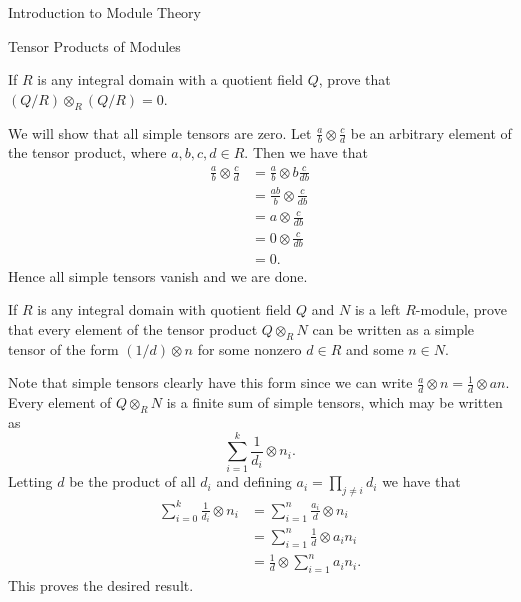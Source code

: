 \begin{chapter}{Introduction to Module Theory}
\begin{section}{Tensor Products of Modules}
\begin{solution}
\end{solution}\oneperpage



\begin{problem}\label{ex:10.4.6}
If $R$ is any integral domain with a quotient field $Q$, prove that $(Q/R)\otimes_R(Q/R) = 0$.
\end{problem}
\begin{solution}
We will show that all simple tensors are zero. Let $\frac{a}{b}\otimes \frac{c}{d}$ be an arbitrary element of the tensor product, where $a,b,c,d\in R$. Then we have that \begin{align*}
\frac{a}{b}\otimes \frac{c}{d} & =\frac{a}{b}\otimes b\frac{c}{db}\\
& =\frac{ab}{b}\otimes \frac{c}{db}\\
& =a\otimes \frac{c}{db}\\
& = 0\otimes \frac{c}{db}\\
& = 0.
\end{align*}
Hence all simple tensors vanish and we are done. 
\end{solution}\oneperpage



\begin{problem}\label{ex:10.4.7}
If $R$ is any integral domain with quotient field $Q$ and $N$ is a left $R$-module, prove that every element of the tensor product $Q\otimes_R N$ can be written as a simple tensor of the form $(1/d)\otimes n$ for some nonzero $d\in R$ and some $n\in N$. 
\end{problem}
\begin{solution}
Note that simple tensors clearly have this form since we can write $\frac{a}{d}\otimes n = \frac{1}{d}\otimes an$. Every element of $Q\otimes_R N$ is a finite sum of simple tensors, which may be written as \[
\sum_{i=1}^k \frac{1}{d_i}\otimes n_i.
\]
Letting $d$ be the product of all $d_i$ and defining $a_i = \prod_{j\neq i} d_i$ we have that \begin{align*}
\sum_{i=0}^k \frac{1}{d_i}\otimes n_i &= \sum_{i=1}^n \frac{a_i}{d} \otimes n_i\\
& = \sum_{i=1}^n \frac{1}{d}\otimes a_in_i\\
& = \frac{1}{d}\otimes\sum_{i=1}^n a_in_i.
\end{align*}
This proves the desired result. 
\end{solution}\oneperpage




\end{section}
\end{chapter}
